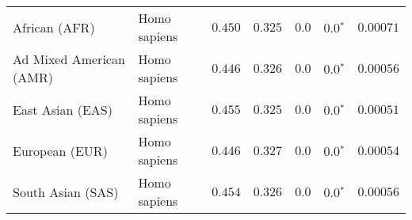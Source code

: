 \begin{center}
\begin{adjustbox}{width = 1\textwidth}
\begin{tabular}{|l|l|r|r|r|r|r|}
                  African (AFR) &         Homo sapiens &                                           $ 0.450$ &                                           $ 0.325$ &            $0.0$ &                  $\bm{0.0{^*}}$ &          $0.00071$ \\
        Ad Mixed American (AMR) &         Homo sapiens &                                           $ 0.446$ &                                           $ 0.326$ &            $0.0$ &                  $\bm{0.0{^*}}$ &          $0.00056$ \\
               East Asian (EAS) &         Homo sapiens &                                           $ 0.455$ &                                           $ 0.325$ &            $0.0$ &                  $\bm{0.0{^*}}$ &          $0.00051$ \\
                 European (EUR) &         Homo sapiens &                                           $ 0.446$ &                                           $ 0.327$ &            $0.0$ &                  $\bm{0.0{^*}}$ &          $0.00054$ \\
              South Asian (SAS) &         Homo sapiens &                                           $ 0.454$ &                                           $ 0.326$ &            $0.0$ &                  $\bm{0.0{^*}}$ &          $0.00056$ \\
\bottomrule
\end{tabular}
\end{adjustbox}
\newpage
\end{center}
